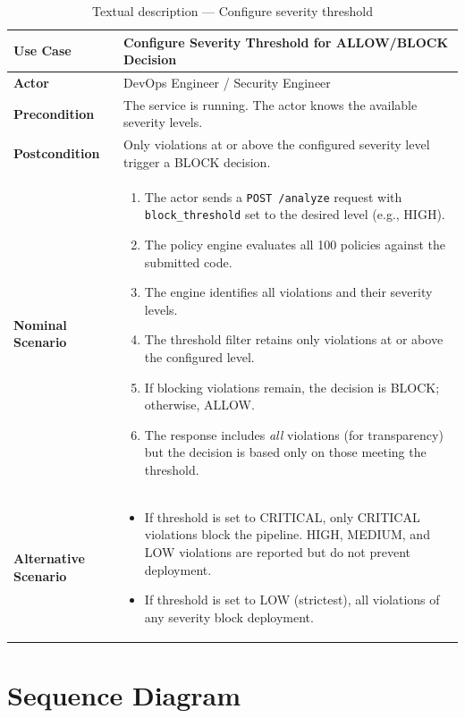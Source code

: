 \begin{table}[H]
\centering
\caption{Textual description — Configure severity threshold}
\label{tab:sprint2-usecase-text}
\begin{tabular}{|p{3.5cm}|p{9.5cm}|}
\hline
\textbf{Use Case} & Configure Severity Threshold for ALLOW/BLOCK Decision \\
\hline
\textbf{Actor} & DevOps Engineer / Security Engineer \\
\hline
\textbf{Precondition} & The service is running. The actor knows the available severity levels. \\
\hline
\textbf{Postcondition} & Only violations at or above the configured severity level trigger a BLOCK decision. \\
\hline
\textbf{Nominal Scenario} &
\begin{enumerate}[nosep]
    \item The actor sends a \texttt{POST /analyze} request with \texttt{block\_threshold} set to the desired level (e.g., HIGH).
    \item The policy engine evaluates all 100 policies against the submitted code.
    \item The engine identifies all violations and their severity levels.
    \item The threshold filter retains only violations at or above the configured level.
    \item If blocking violations remain, the decision is BLOCK; otherwise, ALLOW.
    \item The response includes \textit{all} violations (for transparency) but the decision is based only on those meeting the threshold.
\end{enumerate} \\
\hline
\textbf{Alternative Scenario} &
\begin{itemize}[nosep]
    \item If threshold is set to CRITICAL, only CRITICAL violations block the pipeline. HIGH, MEDIUM, and LOW violations are reported but do not prevent deployment.
    \item If threshold is set to LOW (strictest), all violations of any severity block deployment.
\end{itemize} \\
\hline
\end{tabular}
\end{table}

\section{Sequence Diagram}

